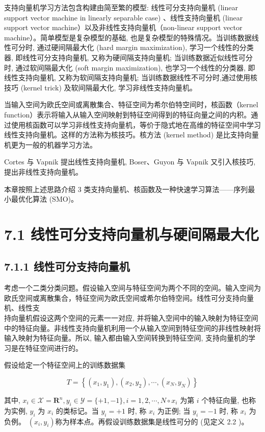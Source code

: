 \documentclass[10pt]{article}
\begin{document}
\begin{CJK*}{UTF8}{bsmi}
支持向量机学习方法包含构建由简至繁的模型: 线性可分支持向量机 (linear support vector machine in linearly separable case) 、线性支持向量机 (linear support vector machine）以及非线性支持向量机（non-linear support vector machine）。简单模型是复杂模型的基础, 也是复杂模型的特殊情况。当训练数据线性可分时, 通过硬间隔最大化 (hard margin maximization), 学习一个线性的分类器, 即线性可分支持向量机, 又称为硬间隔支持向量机; 当训练数据近似线性可分时, 通过软间隔最大化 (soft margin maximization), 也学习一个线性的分类器, 即线性支持向量机, 又称为软间隔支持向量机; 当训练数据线性不可分时,通过使用核技巧 (kernel trick) 及软间隔最大化, 学习非线性支持向量机。

当输入空间为欧氏空间或离散集合、特征空间为希尔伯特空间时，核函数（kernel function）表示将输入从输入空间映射到特征空间得到的特征向量之间的内积。通过使用核函数可以学习非线性支持向量机，等价于隐式地在高维的特征空间中学习线性支持向量机。这样的方法称为核技巧。核方法 (kernel method) 是比支持向量机更为一般的机器学习方法。

Cortes 与 Vapnik 提出线性支持向量机, Boser、Guyon 与 Vapnik 又引入核技巧, 提出非线性支持向量机。

本章按照上述思路介绍 3 类支持向量机、核函数及一种快速学习算法——序列最小最优化算法 (SMO)。

\section*{7.1 线性可分支持向量机与硬间隔最大化}
\subsection*{7.1.1 线性可分支持向量机}
考虑一个二类分类问题。假设输入空间与特征空间为两个不同的空间。输入空间为欧氏空间或离散集合，特征空间为欧氏空间或希尔伯特空间。线性可分支持向量机、线性支\\
持向量机假设这两个空间的元素一一对应, 并将输入空间中的输入映射为特征空间中的特征向量。非线性支持向量机利用一个从输入空间到特征空间的非线性映射将输入映射为特征向量。所以, 输入都由输入空间转换到特征空间, 支持向量机的学习是在特征空间进行的。

假设给定一个特征空间上的训练数据集

$$
T=\left\{\left(x_{1}, y_{1}\right),\left(x_{2}, y_{2}\right), \cdots,\left(x_{N}, y_{N}\right)\right\}
$$

其中, $x_{i} \in \mathcal{X}=\boldsymbol{R}^{n}, y_{i} \in \mathcal{Y}=\{+1,-1\}, i=1,2, \cdots, N \circ x_{i}$ 为第 $i$ 个特征向量, 也称为实例, $y_{i}$ 为 $x_{i}$ 的类标记。当 $y_{i}=+1$ 时, 称 $x_{i}$ 为正例; 当 $y_{i}=-1$ 时, 称 $x_{i}$ 为负例。 $\left(x_{i}, y_{i}\right)$称为样本点。再假设训练数据集是线性可分的 (见定义 2.2 )。


\end{CJK*}
\end{document}
